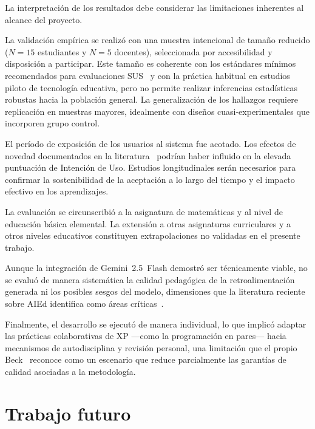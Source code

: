 La interpretación de los resultados debe considerar las limitaciones inherentes
al alcance del proyecto.

La validación empírica se realizó con una muestra intencional de tamaño
reducido ($N=15$ estudiantes y $N=5$ docentes), seleccionada por accesibilidad
y disposición a participar. Este tamaño es coherente con los estándares mínimos
recomendados para evaluaciones SUS~\cite{bangor2008sus} y con la práctica
habitual en estudios piloto de tecnología educativa, pero no permite realizar
inferencias estadísticas robustas hacia la población general. La generalización
de los hallazgos requiere replicación en muestras mayores, idealmente con
diseños cuasi-experimentales que incorporen grupo control.

El período de exposición de los usuarios al sistema fue acotado. Los efectos
de novedad documentados en la literatura~\cite{vlachogianni2022sus} podrían
haber influido en la elevada puntuación de Intención de Uso. Estudios
longitudinales serán necesarios para confirmar la sostenibilidad de la
aceptación a lo largo del tiempo y el impacto efectivo en los aprendizajes.

La evaluación se circunscribió a la asignatura de matemáticas y al nivel de
educación básica elemental. La extensión a otras asignaturas curriculares y a
otros niveles educativos constituyen extrapolaciones no validadas en el presente
trabajo.

Aunque la integración de Gemini~2.5~Flash demostró ser técnicamente viable, no
se evaluó de manera sistemática la calidad pedagógica de la retroalimentación
generada ni los posibles sesgos del modelo, dimensiones que la literatura
reciente sobre AIEd identifica como áreas críticas~\cite{topali2025aied}.

Finalmente, el desarrollo se ejecutó de manera individual, lo que implicó
adaptar las prácticas colaborativas de XP ---como la programación en pares---
hacia mecanismos de autodisciplina y revisión personal, una limitación que el
propio Beck~\cite{beck2004xp} reconoce como un escenario que reduce
parcialmente las garantías de calidad asociadas a la metodología.

\section{Trabajo futuro}
\label{sec:trabajo-futuro}

